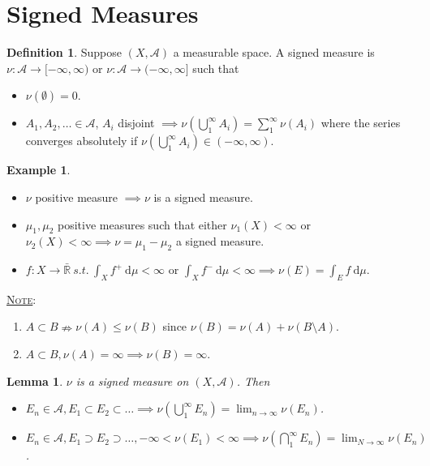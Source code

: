 \documentclass{report}
\newcommand{\R}{\mathbb{R}}
\newcommand{\st}{\ s.t.\ }
\newcommand{\cA}{\mathcal{A}}
\newcommand{\df}{\ \mathrm{d}}
\newcommand{\fancyem}[1]{\underline{\textsc{#1}}}
\newtheorem{lemma}[theorem]{Lemma}
\theoremstyle{definition}
\newtheorem{definition}[theorem]{Definition}
\newtheorem{example}[theorem]{Example}
\theoremstyle{remark}
\newcommand{\fnl}{\parbox[t]{0\linewidth}{}}
\begin{document}
\section{Signed Measures}
\begin{definition}
	Suppose $(X, \cA)$ a measurable space. A signed measure is $\nu: \cA \to [-\infty, \infty)$ or $\nu: \cA \to (-\infty, \infty]$ such that \begin{itemize}
		\item $\nu(\emptyset) = 0$.
		\item $A_1, A_2, \ldots \in \cA$, $A_i$ disjoint $\implies \displaystyle \nu\left(\bigcup_1^\infty A_i\right) = \sum_1^\infty \nu(A_i)$ where the series converges absolutely if $\displaystyle \nu\left(\bigcup_1^\infty A_i\right) \in (-\infty, \infty)$.
	\end{itemize}
\end{definition}
\begin{example}\fnl
	\begin{itemize}
		\item $\nu$ positive measure $\implies \nu$ is a signed measure.
		\item $\mu_1, \mu_2$ positive measures such that either $\nu_1(X) < \infty$ or $\nu_2(X) < \infty \implies  \nu = \mu_1 - \mu_2$ a signed measure.
		\item $f: X \to \bar{\R} \st \displaystyle \int_X f^+ \df \mu < \infty$ or $\displaystyle \int_X f^- \df \mu < \infty \implies \nu(E) = \int_E f \df \mu$.
	\end{itemize}
\end{example}

\fancyem{Note}: 
\begin{enumerate}
	\item $A \subset B \nRightarrow \nu(A) \leq \nu(B)$ since $\nu(B) = \nu(A) + \nu(B \setminus A)$.
	\item $A \subset B, \nu(A) = \infty \implies \nu(B) = \infty$.
\end{enumerate}

\begin{lemma}
	$\nu$ is a signed measure on $(X, \cA)$. Then
	\begin{itemize}
		\item $E_n \in \cA, E_1 \subset E_2 \subset \ldots \implies \displaystyle \nu\left(\bigcup_1^\infty E_n\right) = \lim_{n \to \infty}\nu(E_n)$.
		\item $E_n \in \cA, E_1 \supset E_2 \supset \ldots, -\infty < \nu(E_1) < \infty \implies \displaystyle \nu\left(\bigcap_1^\infty E_n\right) = \lim_{N \to \infty} \nu(E_n)$.
	\end{itemize}
\end{lemma}
\end{document}

